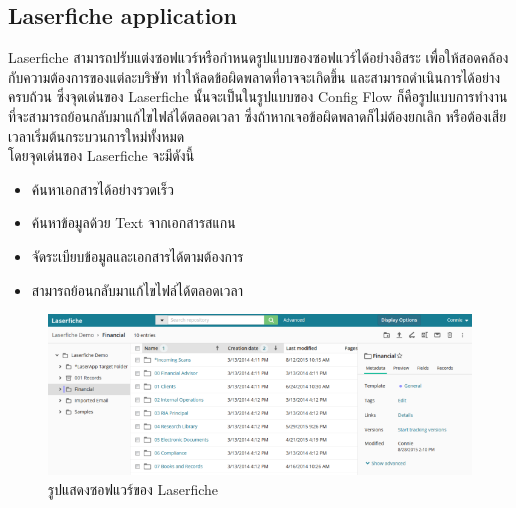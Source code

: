 \documentclass[12pt,oneside,openright,a4paper]{cpe-thai-project}
\begin{document}
\subsection{Laserfiche application}
\hspace*{1cm} Laserfiche \cite{WhatIsLaserFiche} สามารถปรับแต่งซอฟแวร์หรือกำหนดรูปแบบของซอฟแวร์ได้อย่างอิสระ เพื่อให้สอดคล้องกับความต้องการของแต่ละบริษัท ทำให้ลดข้อผิดพลาดที่อาจจะเกิดขึ้น และสามารถดำเนินการได้อย่างครบถ้วน ซึ่งจุดเด่นของ Laserfiche นั้นจะเป็นในรูปแบบของ Config Flow ก็คือรูปแบบการทำงานที่จะสามารถย้อนกลับมาแก้ไขไฟล์ได้ตลอดเวลา ซึ่งถ้าหากเจอข้อผิดพลาดก็ไม่ต้องยกเลิก หรือต้องเสียเวลาเริ่มต้นกระบวนการใหม่ทั้งหมด \\
\hspace*{1cm} โดยจุดเด่นของ Laserfiche จะมีดังนี้
\begin{itemize}
  \item ค้นหาเอกสารได้อย่างรวดเร็ว
  \item ค้นหาข้อมูลด้วย Text จากเอกสารสแกน
  \item จัดระเบียบข้อมูลและเอกสารได้ตามต้องการ
  \item สามารถย้อนกลับมาแก้ไขไฟล์ได้ตลอดเวลา
\end{itemize}

\begin{figure}[!h]\centering
  \includegraphics[width=13cm]{./assets/laserfiche.png}
  \caption{รูปแสดงซอฟแวร์ของ Laserfiche}\label{fig:laserfiche}
\end{figure}
\end{document}

